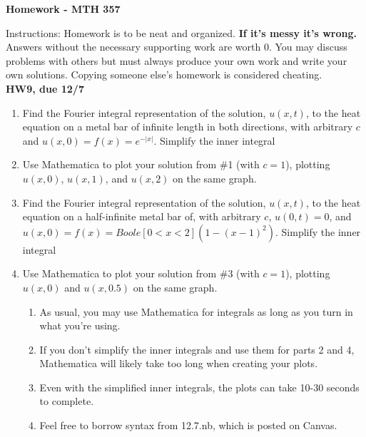 \documentclass[10pt]{article}
\begin{document}
\begin{center}
{\Large\bf  Homework - MTH 357}\\
\vspace{.1in}


\end{center}

\noindent Instructions:  
Homework is to be neat and organized.  \textbf{If it's messy it's wrong.} Answers without the necessary supporting work are worth 0.   You may discuss problems with others but must always produce your own work and write your own solutions.  Copying someone else's homework is considered cheating.\\


\noindent \textbf{HW9, due 12/7}\\
\begin{enumerate}
\item  Find the Fourier integral representation of the solution, $u(x,t)$, to the heat equation on a metal bar of infinite length in both directions, with arbitrary $c$ and $u(x,0)=f(x)=e^{-|x|}$. Simplify the inner integral
\item Use Mathematica to plot your solution from \#1 (with $c=1$), plotting $u(x,0)$, $u(x,1)$, and $u(x,2)$ on the same graph.
\item  Find the Fourier integral representation of the solution, $u(x,t)$, to the heat equation on a half-infinite metal bar of, with arbitrary $c$, $u(0,t)=0$, and $u(x,0)=f(x)=Boole[0<x<2](1-(x-1)^2)$. Simplify the inner integral
\item Use Mathematica to plot your solution from \#3 (with $c=1$), plotting $u(x,0)$ and $u(x,0.5)$ on the same graph.
\begin{enumerate}
\item As usual, you may use Mathematica for integrals as long as you turn in what you're using.
\item If you don't simplify the inner integrals and use them for parts 2 and 4, Mathematica will likely take too long when creating your plots. 
\item Even with the simplified inner integrals, the plots can take 10-30 seconds to complete. 
\item Feel free to borrow syntax from 12.7.nb, which is posted on Canvas.
\end{enumerate}
\end{enumerate}
\end{document}
